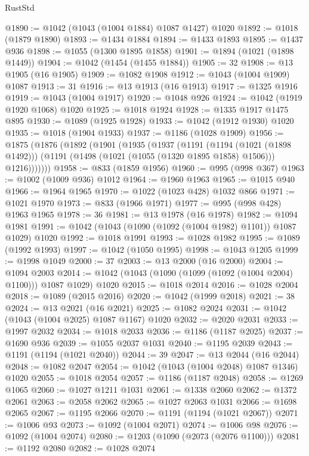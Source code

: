 \begin{lexlean}{RustStd}
\begin{coremodule}
{\begin{coremodule}
{{{{{{{{{{{{{{{{{{{{{{{{{{@1890 := @1042 (@1043 (@1004 @1884) @1087 @1427) @1020
@1892 := @1018 (@1879 @1890)
@1893 := @1434 @1884
@1894 := @1433 @1893
@1895 := @1437 @936
@1898 := @1055 (@1300 @1895 @1858)
@1901 := @1894 (@1021 (@1898 @1449))
@1904 := @1042 (@1454 (@1455 @1884))
@1905 := 32
@1908 := @13 @1905 (@16 @1905)
@1909 := @1082 @1908
@1912 := @1043 (@1004 @1909) @1087
@1913 := 31
@1916 := @13 @1913 (@16 @1913)
@1917 := @1325 @1916
@1919 := @1043 (@1004 @1917)
@1920 := @1048 @926
@1924 := @1042 (@1919 @1920 @1068) @1020
@1925 := @1018 @1924
@1928 := @1335 @1917 @1475 @895
@1930 := @1089 (@1925 @1928)
@1933 := @1042 (@1912 @1930) @1020
@1935 := @1018 (@1904 @1933)
@1937 := @1186 (@1028 @1909)
@1956 := @1875
    (@1876
      (@1892
        (@1901
          (@1935
            (@1937
              (@1191
                (@1194 (@1021 (@1898 @1492)))
                (@1191 (@1498 (@1021 (@1055 (@1320 @1895 @1858) @1506))) @1216)))))))
@1958 := @833 (@1859 @1956)
@1960 := @995 (@998 @367)
@1963 := @1002 (@1009 @936) @1012
@1964 := @1960 @1963
@1965 := @1015 @940
@1966 := @1964 @1965
@1970 := @1022 (@1023 @428) @1032 @866
@1971 := @1021 @1970
@1973 := @833 (@1966 @1971)
@1977 := @995 (@998 @428) @1963 @1965
@1978 := 36
@1981 := @13 @1978 (@16 @1978)
@1982 := @1094 @1981
@1991 := @1042 (@1043 (@1090 (@1092 (@1004 @1982) @1101)) @1087 @1029) @1020
@1992 := @1018 @1991
@1993 := @1028 @1982
@1995 := @1089 (@1992 @1993)
@1997 := @1042 (@1050 @1995)
@1998 := @1043 @1205
@1999 := @1998 @1049
@2000 := 37
@2003 := @13 @2000 (@16 @2000)
@2004 := @1094 @2003
@2014 := @1042 (@1043 (@1090 (@1099 (@1092 (@1004 @2004) @1100))) @1087 @1029) @1020
@2015 := @1018 @2014
@2016 := @1028 @2004
@2018 := @1089 (@2015 @2016)
@2020 := @1042 (@1999 @2018)
@2021 := 38
@2024 := @13 @2021 (@16 @2021)
@2025 := @1082 @2024
@2031 := @1042 (@1043 (@1004 @2025) @1087 @1167) @1020
@2032 := @2020 @2031
@2033 := @1997 @2032
@2034 := @1018 @2033
@2036 := @1186 (@1187 @2025)
@2037 := @1690 @936
@2039 := @1055 @2037 @1031
@2040 := @1195 @2039
@2043 := @1191 (@1194 (@1021 @2040))
@2044 := 39
@2047 := @13 @2044 (@16 @2044)
@2048 := @1082 @2047
@2054 := @1042 (@1043 (@1004 @2048) @1087 @1346) @1020
@2055 := @1018 @2054
@2057 := @1186 (@1187 @2048)
@2058 := @1269 @1065
@2060 := @1027 @1211 @1031
@2061 := @1338 @2060
@2062 := @1372 @2061
@2063 := @2058 @2062
@2065 := @1027 @2063 @1031
@2066 := @1698 @2065
@2067 := @1195 @2066
@2070 := @1191 (@1194 (@1021 @2067))
@2071 := @1006 @93
@2073 := @1092 (@1004 @2071)
@2074 := @1006 @98
@2076 := @1092 (@1004 @2074)
@2080 := @1203 (@1090 (@2073 (@2076 @1100)))
@2081 := @1192 @2080
@2082 := @1028 @2074
}}}}}}}}}}}}}}}}}}}}}}}}}}
\end{coremodule}}
\end{coremodule}
\end{lexlean}
